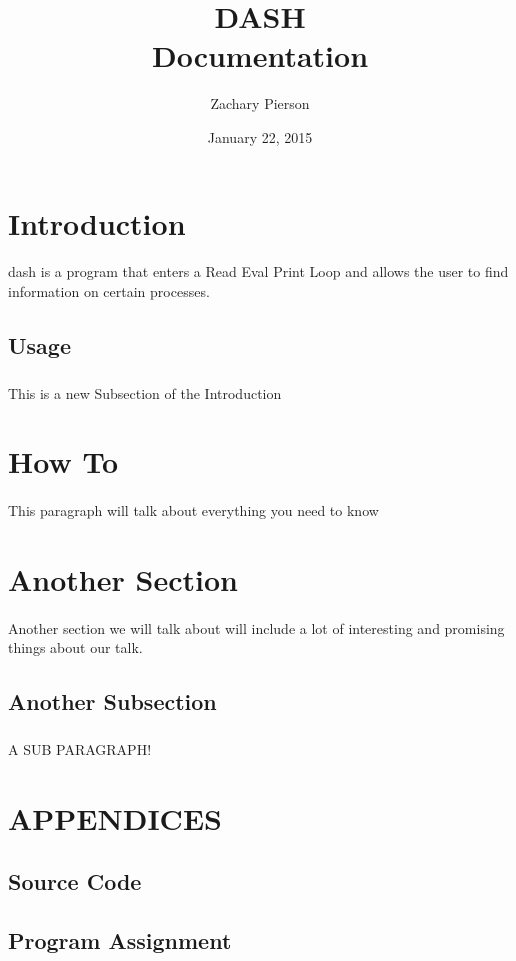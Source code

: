\documentclass[10pt]{article}
\title{\textbf{DASH} \\Documentation}
\date{January 22, 2015}
\author{Zachary Pierson}
\begin{document}
\maketitle

\par\vspace{\fill}%
\tableofcontents
\newpage

\section{Introduction}
\paragraph{}
dash is a program that enters a Read Eval Print Loop and allows
the user to find information on certain processes.  

\subsection{Usage}
\subparagraph{}
This is a new Subsection of the Introduction

\section{How To}
\paragraph{}
This paragraph will talk about everything you need to know

\section{Another Section}
\paragraph{}
Another section we will talk about will include a lot of interesting and promising things about our talk.

\subsection{Another Subsection}
\subparagraph{}
A SUB PARAGRAPH!

\newpage
\section{APPENDICES}
\appendix

\subsection{Source Code}

\subsection{Program Assignment}

\end{document}
